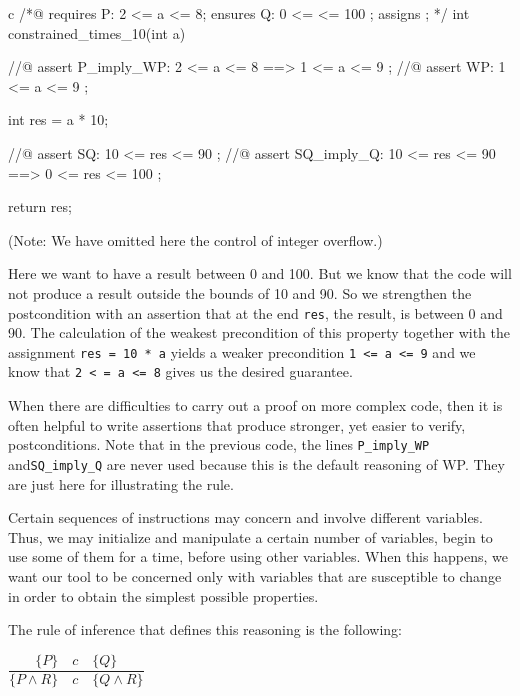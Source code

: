 \documentclass[middle]{zmdocument}
\begin{document}
\begin{CodeBlock}{c}
/*@
  requires P: 2 <= a <= 8;
  ensures  Q: 0 <= \result <= 100 ;
  assigns  \nothing ;
*/
int constrained_times_10(int a){
  //@ assert P_imply_WP: 2 <= a <= 8 ==> 1 <= a <= 9 ;
  //@ assert WP:         1 <= a <= 9 ;

  int res = a * 10;

  //@ assert SQ:         10 <= res <= 90 ;
  //@ assert SQ_imply_Q: 10 <= res <= 90 ==> 0 <= res <= 100 ;

  return res;
}
\end{CodeBlock}



(Note: We have omitted here the control of integer overflow.)



Here we want to have a result between 0 and 100. But we know that the
code will not produce a result outside the bounds of 10 and 90. So we
strengthen the postcondition with an assertion that at the end
\texttt{res}, the result, is between 0 and 90. The calculation of the
weakest precondition of this property together with the assignment
\texttt{res = 10 * a} yields a weaker precondition
\texttt{1 <= a <= 9} and we know that
\texttt{2 < = a <= 8} gives us the desired
guarantee.



When there are difficulties to carry out a proof on more complex code,
then it is often helpful to write assertions that produce stronger, yet
easier to verify, postconditions. Note that in the previous code, the
lines \texttt{P\_imply\_WP} and\texttt{SQ\_imply\_Q} are never used
because this is the default reasoning of WP. They are just here for
illustrating the rule.




Certain sequences of instructions may concern and involve different
variables. Thus, we may initialize and manipulate a certain number of
variables, begin to use some of them for a time, before using other
variables. When this happens, we want our tool to be concerned only with
variables that are susceptible to change in order to obtain the simplest
possible properties.



The rule of inference that defines this reasoning is the following:




\begin{center}
$\dfrac{\{P\}\quad c\quad \{Q\}}{\{P \wedge R\}\quad c\quad \{Q \wedge R\}}$


\end{center}
\end{document}
